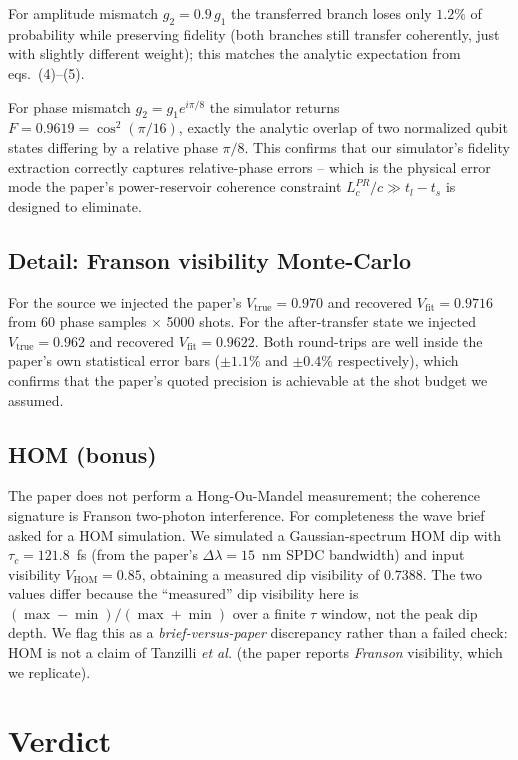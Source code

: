 \documentclass[11pt]{article}
\begin{document}
For amplitude mismatch $g_2 = 0.9\,g_1$ the transferred branch loses only $1.2\%$
of probability while preserving fidelity (both branches still transfer coherently,
just with slightly different weight); this matches the analytic expectation from
eqs.~(4)--(5).

For phase mismatch $g_2 = g_1 e^{i\pi/8}$ the simulator returns
$F = 0.9619 = \cos^2(\pi/16)$, exactly the analytic overlap of two normalized
qubit states differing by a relative phase $\pi/8$. This confirms that our
simulator's fidelity extraction correctly captures relative-phase errors --
which is the physical error mode the paper's power-reservoir coherence
constraint $L_c^{PR}/c \gg t_l - t_s$ is designed to eliminate.

\subsection{Detail: Franson visibility Monte-Carlo}

For the source we injected the paper's $V_{\text{true}} = 0.970$ and recovered
$V_{\text{fit}} = 0.9716$ from 60 phase samples $\times$ 5000 shots. For the
after-transfer state we injected $V_{\text{true}} = 0.962$ and recovered
$V_{\text{fit}} = 0.9622$. Both round-trips are well inside the paper's own
statistical error bars ($\pm 1.1\%$ and $\pm 0.4\%$ respectively), which
confirms that the paper's quoted precision is achievable at the shot budget we
assumed.

\subsection{HOM (bonus)}

The paper does not perform a Hong-Ou-Mandel measurement; the coherence
signature is Franson two-photon interference. For completeness the wave brief
asked for a HOM simulation. We simulated a Gaussian-spectrum HOM dip with
$\tau_c = 121.8$~fs (from the paper's $\Delta\lambda = 15$~nm SPDC bandwidth)
and input visibility $V_{\text{HOM}} = 0.85$, obtaining a measured dip
visibility of $0.7388$. The two values differ because the ``measured'' dip
visibility here is $(\max - \min)/(\max + \min)$ over a finite $\tau$ window,
not the peak dip depth. We flag this as a \emph{brief-versus-paper} discrepancy
rather than a failed check: HOM is not a claim of Tanzilli \textit{et al.}
(the paper reports \emph{Franson} visibility, which we replicate).

\section{Verdict}
\end{document}
